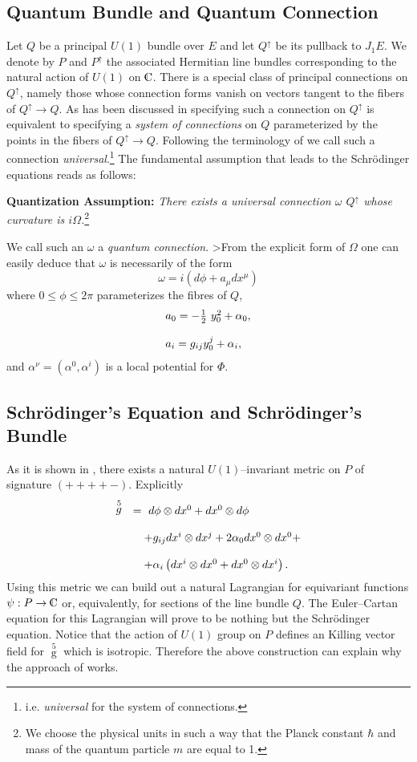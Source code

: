 \documentclass[12pt]{article}
\def\complex{{\kern .1em {\raise .47ex \hbox
{$\scriptscriptstyle
|$}}
\kern -.4em {\rm C}}}
\begin{document}
\subsection{Quantum Bundle and Quantum Connection}

Let $Q$ be a principal $U (1)$ bundle over $E$
and let $Q^{\uparrow}$ be its pullback to $J_{1}E$. 
We denote by $P$ and $P^{\uparrow}$ the associated Hermitian
line bundles corresponding to the natural action of $U (1)$ on 
$\complex$.  There is a special class of principal connections on
$Q^{\uparrow}$,  namely those whose connection forms vanish on
vectors tangent to the fibers of $Q^{\uparrow} \to
 Q$.  As has
been discussed in \cite{mod}
specifying such a connection on
$Q^{\uparrow}$ is equivalent to specifying a {\sl system of
connections} on $Q$ parameterized by the points in the fibers of
$Q^{\uparrow} \to Q$.  Following the terminology of \cite{mod} we
call such a connection {\sl universal}.\footnote{i.e.  {\sl
universal} for the system of connections.}
The fundamental assumption that leads to the Schr\"{o}dinger
equations  reads as follows:

\medskip
\noindent
{\bf Quantization Assumption: }
{\sl There exists a universal connection
$\omega$  $Q^{\uparrow}$ whose curvature is
$i\Omega$.}\footnote{We choose the physical units in such a way
that the Planck constant
$\hbar$ and mass of the quantum particle $m$ are equal to 1. }

We call such an $\omega$ a {\sl quantum connection}. 
>From the explicit
form of $\Omega$ one can easily deduce that $\omega$ is
necessarily of the form
$$
\omega = i\left ( d \phi + a_{\mu} dx^{\mu}\right)
$$
where $0\leq \phi \leq 2\pi$ parameterizes the fibres of $Q$, 
$$
\begin{array}{l}
a_{0} = - {1\over 2} \ y^{2}_{0} + \alpha_{0} ,  \cr\cr
a_{i} =  g_{ij} y^{j}_{0} + \alpha_{i} ,  
\end{array}
$$
and $\alpha^{\nu} = \left (\alpha^{0}, \alpha^{i}\right)$ is a local
potential for $\Phi$. 
\subsection{Schr\"{o}dinger's Equation and Schr\"{o}dinger's Bundle}

As it is shown in \cite{jamo},  there exists a natural $U (1)$--invariant
metric on $P$ of signature $ (++++-)$.  Explicitly 
$$
\begin{array}{ll}
\displaystyle\mathop{g}\limits^{5}
&  =\   d\phi \otimes dx^{0} + dx^{0} \otimes d\phi
\cr\cr
& \quad +g_{ij}dx^{i}\otimes dx^{j} + 2 \alpha_{0}
dx^{0}\otimes  dx^{0} + \cr\cr
& \quad + \alpha_{i}
\left ( dx^{i}\otimes dx^{0} + dx^{0}\otimes dx^{i} \right) . 
\end{array}
$$
Using this metric we can build out a natural Lagrangian for
equivariant functions $\psi :  P \rightarrow \complex$ or, 
equivalently,  for sections of the line bundle $Q$.  The Euler--Cartan
equation for this Lagrangian will prove to be  nothing but the
Schr\"{o}dinger equation.  Notice that the action of $U (1)$ group
on $P$ defines
an Killing vector field for $\mathop{g}\limits^{5}$ which is isotropic.
Therefore the above construction can explain why the
approach of \cite{duv} works.
\end{document}

